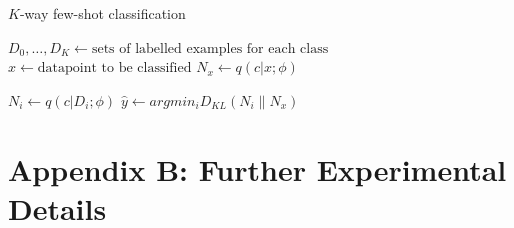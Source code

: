 \documentclass{article} %
\newcommand{\KL}[2]{D_{KL} \left (#1 \| #2 \right )}
\begin{document}
    \begin{algorithm}[H]
    \caption{$K$-way few-shot classification} 
    \label{alg:fewshot}
    \begin{algorithmic}
       \STATE $D_0, \dots, D_K \gets \text{sets of labelled examples for each class}$
        \STATE $x \gets \text{datapoint to be classified}$
        \STATE $N_x \gets q(c | x ; \phi)$

        \STATE $N_i \gets q(c | D_i; \phi)$
        \ENDFOR
        \STATE $\hat{y} \gets argmin_{i} \KL{N_i}{N_x}$
    \end{algorithmic}
\end{algorithm}
\section{Appendix B: Further Experimental Details}
\label{appendix:experimental_details}
\end{document}
